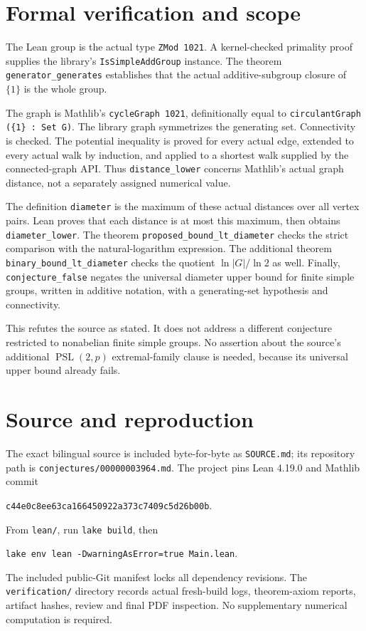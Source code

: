 \documentclass[11pt]{article}
\begin{document}
\section*{Formal verification and scope}
The Lean group is the actual type \texttt{ZMod 1021}. A kernel-checked
primality proof supplies the library's \texttt{IsSimpleAddGroup} instance.
The theorem \texttt{generator\_generates} establishes that the actual
additive-subgroup closure of $\{1\}$ is the whole group.

The graph is Mathlib's \texttt{cycleGraph 1021}, definitionally equal to
\texttt{circulantGraph (\{1\} : Set G)}. The library graph symmetrizes the
generating set. Connectivity is checked. The potential inequality is
proved for every actual edge, extended to every actual walk by induction,
and applied to a shortest walk supplied by the connected-graph API.
Thus \texttt{distance\_lower} concerns Mathlib's actual graph distance,
not a separately assigned numerical value.

The definition \texttt{diameter} is the maximum of these actual distances
over all vertex pairs. Lean proves that each distance is at most this
maximum, then obtains \texttt{diameter\_lower}. The theorem
\texttt{proposed\_bound\_lt\_diameter} checks the strict comparison with
the natural-logarithm expression. The additional theorem
\texttt{binary\_bound\_lt\_diameter} checks the quotient
$\ln|G|/\ln2$ as well. Finally, \texttt{conjecture\_false} negates the
universal diameter upper bound for finite simple groups, written in
additive notation, with a generating-set hypothesis and connectivity.

This refutes the source as stated. It does not address a different
conjecture restricted to nonabelian finite simple groups. No assertion
about the source's additional $\operatorname{PSL}(2,p)$ extremal-family
clause is needed, because its universal upper bound already fails.

\section*{Source and reproduction}
The exact bilingual source is included byte-for-byte as \texttt{SOURCE.md};
its repository path is \texttt{conjectures/00000003964.md}. The project
pins Lean 4.19.0 and Mathlib commit
\begin{center}\small\texttt{c44e0c8ee63ca166450922a373c7409c5d26b00b}.\end{center}
From \texttt{lean/}, run \texttt{lake build}, then
\begin{center}\small\texttt{lake env lean -DwarningAsError=true Main.lean}.\end{center}
The included public-Git manifest locks all dependency revisions.
The \texttt{verification/} directory records actual fresh-build logs,
theorem-axiom reports, artifact hashes, review and final PDF inspection.
No supplementary numerical computation is required.
\end{document}
